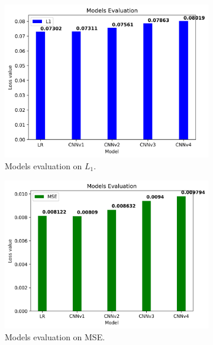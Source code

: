 \begin{figure}[H]\centering
  \begin{subfigure}[t]{0.45\textwidth}
    \centering
    \includegraphics[width=\linewidth]{img/ten-trials/models_evaluation_ten_trials_l1.png}
    \caption{Models evaluation on $L_1$.}
  \end{subfigure}
  \begin{subfigure}[t]{0.45\textwidth}
    \centering
    \includegraphics[width=\linewidth]{img/ten-trials/models_evaluation_ten_trials_mse.png}
    \caption{Models evaluation on MSE.}
  \end{subfigure}
  \\
  \begin{subfigure}[t]{0.45\textwidth}

\end{subfigure}
\end{figure}
